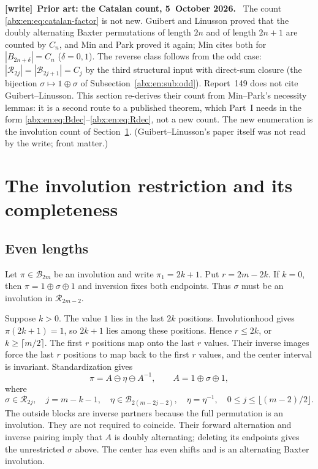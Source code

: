\documentclass[11pt,letterpaper]{article}
\numberwithin{equation}{section}
\theoremstyle{remark}\newtheorem{remark}[theorem]{Remark}
\newcommand{\BB}{\mathcal B}
\newcommand{\RR}{\mathcal R}
\newenvironment{writenote}[1][]{\par\smallskip\begingroup\small
 \noindent\textbf{[write]}\if\relax\detokenize{#1}\relax\else~\textbf{#1.}\fi\ }%
 {\par\endgroup\smallskip}
\begin{document}
\begin{writenote}[Prior art: the Catalan count, 5~October 2026]
The count \eqref{abx:en:eq:catalan-factor} is not new. Guibert and Linusson \cite{GL} proved that the doubly alternating Baxter permutations of length $2n$ and of length $2n+1$ are counted by $C_n$, and Min and Park \cite{minpark} proved it again; Min \cite[p.~254]{min2021} cites both for $|B_{2n+\delta}|=C_n$ ($\delta=0,1$). The reverse class follows from the odd case: $|\RR_{2j}|=|\BB_{2j+1}|=C_j$ by the third structural input with direct-sum closure (the bijection $\sigma\mapsto1\oplus\sigma$ of Subsection~\ref{abx:en:sub:odd}). Report~149 does not cite Guibert--Linusson. This section re-derives their count from Min--Park's necessity lemmas: it is a second route to a published theorem, which Part~I needs in the form \eqref{abx:en:eq:Bdec}--\eqref{abx:en:eq:Rdec}, not a new count. The new enumeration is the involution count of Section~\ref{abx:en:sec:involution}. (Guibert--Linusson's paper itself was not read by the write; front matter.)
\end{writenote}

\section{The involution restriction and its completeness}\label{abx:en:sec:involution}
\subsection{Even lengths}\label{abx:en:sub:even}
Let $\pi\in\BB_{2m}$ be an involution and write $\pi_1=2k+1$.
Put $r=2m-2k$. If $k=0$, then
$\pi=1\oplus\sigma\oplus1$ and inversion fixes both endpoints.
Thus $\sigma$ must be an involution in $\RR_{2m-2}$.

Suppose $k>0$. The value $1$ lies in the last $2k$ positions.
Involutionhood gives $\pi(2k+1)=1$, so $2k+1$ lies among these
positions. Hence $r\le2k$, or $k\ge\lceil m/2\rceil$.
The first $r$ positions map onto the last $r$ values. Their inverse
images force the last $r$ positions to map back to the first $r$
values, and the center interval is invariant. Standardization gives
\begin{equation}\label{abx:en:eq:paired}
 \pi=A\ominus\eta\ominus A^{-1},\qquad
 A=1\oplus\sigma\oplus1,
\end{equation}
where
\[
 \sigma\in\RR_{2j},\quad j=m-k-1,\quad
 \eta\in\BB_{2(m-2j-2)},\quad \eta=\eta^{-1},\quad
 0\le j\le\lfloor(m-2)/2\rfloor.
\]
The outside blocks are inverse partners because the full permutation
is an involution. They are not required to coincide. Their forward
alternation and inverse pairing imply that $A$ is doubly alternating;
deleting its endpoints gives the unrestricted $\sigma$ above.
The center has even shifts and is an alternating Baxter involution.
\end{document}

